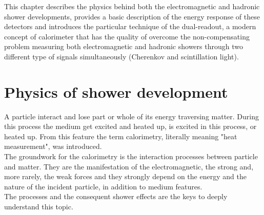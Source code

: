 
This chapter describes the physics behind both the electromagnetic and hadronic shower developments, provides a basic description of the energy response of these detectors and introduces the particular technique of the dual-readout, a modern concept of calorimeter that has the quality of overcome the non-compensating problem measuring both electromagnetic and hadronic showers through two different type of signals simultaneously (Cherenkov and scintillation light).\\

\section{Physics of shower development}
A particle interact and lose part or whole of its energy traversing matter. During this process the medium get excited and heated up, is excited in this process, or heated up. From this feature the term calorimetry, literally meaning "heat measurement", was introduced.\\
The groundwork for the calorimetry is the interaction processes between particle and matter. They are the manifestation of the electromagnetic, the strong and, more rarely, the weak forces and they strongly depend on the energy and the nature of the incident particle, in addition to medium features.\\
The processes and the consequent shower effects are the keys to deeply understand this topic.\\

